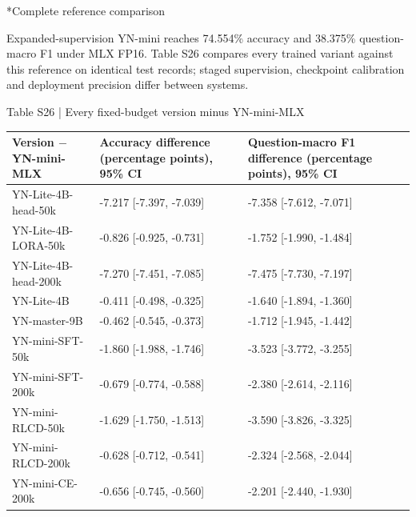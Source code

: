 \documentclass[10pt]{article}
\makeatletter
\renewcommand\subsection{\@startsection{subsection}{2}{\z@}{-1.7ex plus -.5ex minus -.2ex}{.6ex plus .2ex}{\normalfont\normalsize\mdseries}}
\makeatother
\begin{document}
\subsection*{Complete reference comparison}

Expanded-supervision YN-mini reaches 74.554\% accuracy and 38.375\% question-macro F1 under MLX FP16. Table S26 compares every trained variant against this reference on identical test records; staged supervision, checkpoint calibration and deployment precision differ between systems.

\begin{center}\begin{minipage}{\textwidth}\fontsize{8.5}{10.3}\selectfont
Table S26 | Every fixed-budget version minus YN-mini-MLX
\par\vspace{4pt}
\begin{tabularx}{\textwidth}{@{}XXX@{}}\toprule
Version $-$ YN-mini-MLX & Accuracy difference (percentage points), 95\% CI & Question-macro F1 difference (percentage points), 95\% CI \\
\midrule
YN-Lite-4B-head-50k & -7.217 [-7.397, -7.039] & -7.358 [-7.612, -7.071] \\
YN-Lite-4B-LORA-50k & -0.826 [-0.925, -0.731] & -1.752 [-1.990, -1.484] \\
YN-Lite-4B-head-200k & -7.270 [-7.451, -7.085] & -7.475 [-7.730, -7.197] \\
YN-Lite-4B & -0.411 [-0.498, -0.325] & -1.640 [-1.894, -1.360] \\
YN-master-9B & -0.462 [-0.545, -0.373] & -1.712 [-1.945, -1.442] \\
YN-mini-SFT-50k & -1.860 [-1.988, -1.746] & -3.523 [-3.772, -3.255] \\
YN-mini-SFT-200k & -0.679 [-0.774, -0.588] & -2.380 [-2.614, -2.116] \\
YN-mini-RLCD-50k & -1.629 [-1.750, -1.513] & -3.590 [-3.826, -3.325] \\
YN-mini-RLCD-200k & -0.628 [-0.712, -0.541] & -2.324 [-2.568, -2.044] \\
YN-mini-CE-200k & -0.656 [-0.745, -0.560] & -2.201 [-2.440, -1.930] \\
\bottomrule\end{tabularx}
\par{}
\end{minipage}\end{center}
\end{document}
